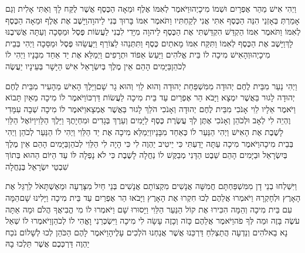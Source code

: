 \documentclass[../main/main.tex]{subfiles}
\begin{document}
\begin{multicols*}{\ncols}
וַיְהִי אִישׁ מֵהַר אֶפְרָיִם וּשְׁמוֹ מִיכָיְהוּ\PreVerseSpace{}וַיֹּאמֶר לְאִמּוֹ אֶלֶף וּמֵאָה הַכֶּסֶף אֲשֶׁר לֻקַּח לָךְ וְאַתִּי אָלִית וְגַם אָמַרְתְּ בְּאָזְנַי הִנֵּה הַכֶּסֶף אִתִּי אֲנִי לְקַחְתִּיו וַתֹּאמֶר אִמּוֹ בָּרוּךְ בְּנִי לַיהוָה\PreVerseSpace{}וַיָּשֶׁב אֶת אֶלֶף וּמֵאָה הַכֶּסֶף לְאִמּוֹ וַתֹּאמֶר אִמּוֹ הַקְדֵּשׁ הִקְדַּשְׁתִּי אֶת הַכֶּסֶף לַיהוָה מִיָּדִי לִבְנִי לַעֲשׂוֹת פֶּסֶל וּמַסֵּכָה וְעַתָּה אֲשִׁיבֶנּוּ לָךְ\PreVerseSpace{}וַיָּשֶׁב אֶת הַכֶּסֶף לְאִמּוֹ וַתִּקַּח אִמּוֹ מָאתַיִם כֶּסֶף וַתִּתְּנֵהוּ לַצּוֹרֵף וַיַּעֲשֵׂהוּ פֶּסֶל וּמַסֵּכָה וַיְהִי בְּבֵית מִיכָיְהוּ\PreVerseSpace{}וְהָאִישׁ מִיכָה לוֹ בֵּית אֱלֹהִים וַיַּעַשׂ אֵפוֹד וּתְרָפִים וַיְמַלֵּא אֶת יַד אַחַד מִבָּנָיו וַיְהִי לוֹ לְכֹהֵן\PreVerseSpace{}בַּיָּמִים הָהֵם אֵין מֶלֶךְ בְּיִשְׂרָאֵל אִישׁ הַיָּשָׁר בְּעֵינָיו יַעֲשֶׂה\OpenSection{}\par
{}וַיְהִי נַעַר מִבֵּית לֶחֶם יְהוּדָה מִמִּשְׁפַּחַת יְהוּדָה וְהוּא לֵוִי וְהוּא גָר שָׁם\PreVerseSpace{}וַיֵּלֶךְ הָאִישׁ מֵהָעִיר מִבֵּית לֶחֶם יְהוּדָה לָגוּר בַּאֲשֶׁר יִמְצָא וַיָּבֹא הַר אֶפְרַיִם עַד בֵּית מִיכָה לַעֲשׂוֹת דַּרְכּוֹ\PreVerseSpace{}וַיֹּאמֶר לוֹ מִיכָה מֵאַיִן תָּבוֹא וַיֹּאמֶר אֵלָיו לֵוִי אָנֹכִי מִבֵּית לֶחֶם יְהוּדָה וְאָנֹכִי הֹלֵךְ לָגוּר בַּאֲשֶׁר אֶמְצָא\PreVerseSpace{}וַיֹּאמֶר לוֹ מִיכָה שְׁבָה עִמָּדִי וֶהְיֵה לִי לְאָב וּלְכֹהֵן וְאָנֹכִי אֶתֶּן לְךָ עֲשֶׂרֶת כֶּסֶף לַיָּמִים וְעֵרֶךְ בְּגָדִים וּמִחְיָתֶךָ וַיֵּלֶךְ הַלֵּוִי\PreVerseSpace{}וַיּוֹאֶל הַלֵּוִי לָשֶׁבֶת אֶת הָאִישׁ וַיְהִי הַנַּעַר לוֹ כְּאַחַד מִבָּנָיו\PreVerseSpace{}וַיְמַלֵּא מִיכָה אֶת יַד הַלֵּוִי וַיְהִי לוֹ הַנַּעַר לְכֹהֵן וַיְהִי בְּבֵית מִיכָה\PreVerseSpace{}וַיֹּאמֶר מִיכָה עַתָּה יָדַעְתִּי כִּי יֵיטִיב יַהְוֶה לִי כִּי הָיָה לִי הַלֵּוִי לְכֹהֵן\PreChapterSpace{}בַּיָּמִים הָהֵם אֵין מֶלֶךְ בְּיִשְׂרָאֵל וּבַיָּמִים הָהֵם שֵׁבֶט הַדָּנִי מְבַקֶּשׁ לוֹ נַחֲלָה לָשֶׁבֶת כִּי לֹא נָפְלָה לּוֹ עַד הַיּוֹם הַהוּא בְּתוֹךְ שִׁבְטֵי יִשְׂרָאֵל בְּנַחֲלָה\OpenSection{}\par
{}וַיִּשְׁלְחוּ בְנֵי דָן מִמִּשְׁפַּחְתָּם חֲמִשָּׁה אֲנָשִׁים מִקְצוֹתָם אֲנָשִׁים בְּנֵי חַיִל מִצָּרְעָה וּמֵאֶשְׁתָּאֹל לְרַגֵּל אֶת הָאָרֶץ וּלְחָקְרָהּ וַיֹּאמְרוּ אֲלֵהֶם לְכוּ חִקְרוּ אֶת הָאָרֶץ וַיָּבֹאוּ הַר אֶפְרַיִם עַד בֵּית מִיכָה וַיָּלִינוּ שָׁם\PreVerseSpace{}הֵמָּה עִם בֵּית מִיכָה וְהֵמָּה הִכִּירוּ אֶת קוֹל הַנַּעַר הַלֵּוִי וַיָּסוּרוּ שָׁם וַיֹּאמְרוּ לוֹ מִי הֱבִיאֲךָ הֲלֹם וּמָה אַתָּה עֹשֶׂה בָּזֶה וּמַה לְּךָ פֹה\PreVerseSpace{}וַיֹּאמֶר אֲלֵהֶם כָּזֹה וְכָזֶה עָשָׂה לִי מִיכָה וַיִּשְׂכְּרֵנִי וָאֱהִי לוֹ לְכֹהֵן\PreVerseSpace{}וַיֹּאמְרוּ לוֹ שְׁאַל נָא בֵאלֹהִים וְנֵדְעָה הֲתַצְלִחַ דַּרְכֵּנוּ אֲשֶׁר אֲנַחְנוּ הֹלְכִים עָלֶיהָ\PreVerseSpace{}וַיֹּאמֶר לָהֶם הַכֹּהֵן לְכוּ לְשָׁלוֹם נֹכַח יַהְוֶה דַּרְכְּכֶם אֲשֶׁר תֵּלְכוּ בָהּ\OpenSection{}\par

\end{multicols*}
\end{document}
